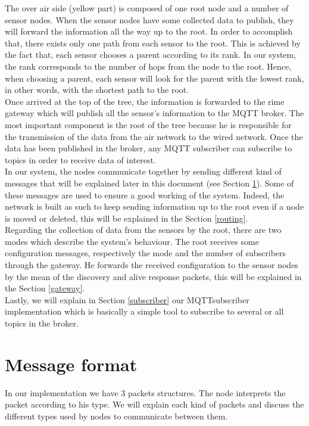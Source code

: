 \documentclass[a4paper,10pt]{article}
\begin{document}
The over air side (yellow part) is composed of one root node and a number of sensor nodes. When the sensor nodes have some collected data to publish, they will forward the information all the way up to the root. In order to accomplish that, there exists only one path from each sensor to the root. This is achieved by the fact that, each sensor chooses a parent according to its rank. In our system, the rank corresponds to the number of hops from the node to the root. Hence, when choosing a parent, each sensor will look for the parent with the lowest rank, in other words, with the shortest path to the root. \\

Once arrived at the top of the tree, the information is forwarded to the rime gateway which will publish all the sensor's information to the MQTT broker. The most important component is the root of the tree because he is responsible for the transmission of the data from the air network to the wired network. Once the data has been published in the broker, any MQTT subscriber can subscribe to topics in order to receive data of interest. \\

In our system, the nodes communicate together by sending different kind of messages that will be explained later in this document (see Section \ref{msgFormat}). Some of these messages are used to ensure a good working of the system. Indeed, the network is built as such to keep sending information up to the root even if a node is moved or deleted, this will be explained in the Section \ref{routing}. \\


Regarding the collection of data from the sensors by the root, there are two modes which describe the system's behaviour. The root receives some configuration messages, respectively the mode and the number of subscribers through the gateway.  He forwards the received configuration to the sensor nodes by the mean of the discovery and alive response packets, this will be explained in the Section \ref{gateway}. \\

Lastly, we will explain in Section \ref{subscriber} our MQTTsubscriber implementation which is basically a simple tool to subscribe to several or all topics in the broker.



\section{Message format}
\label{msgFormat}
In our implementation we have 3 packets structures. The node interprets the packet according to his type. We will explain each kind of packets and discuss the different types used by nodes to communicate between them.
\end{document}

